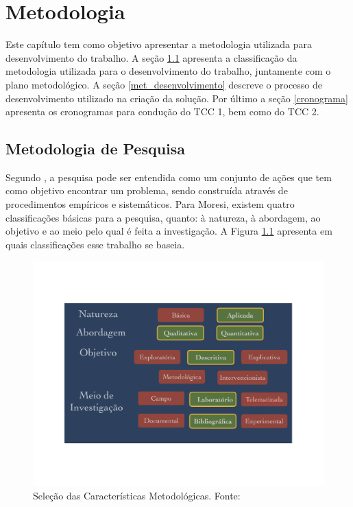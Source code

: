 \chapter[Metodologia]{Metodologia}

Este capítulo tem como objetivo apresentar a metodologia utilizada para desenvolvimento do trabalho. A seção \ref{met_pesquisa} apresenta a classificação da metodologia utilizada para o desenvolvimento do trabalho, juntamente com o plano metodológico. A seção \ref{met_desenvolvimento} descreve o processo de desenvolvimento utilizado na criação da solução. Por último a seção  \ref{cronograma} apresenta os cronogramas para condução do TCC 1, bem como do TCC 2.
\section{Metodologia de Pesquisa}
\label{met_pesquisa}
Segundo \cite{moresi_metodologia_2003}, a pesquisa pode ser entendida como um conjunto de ações que tem como objetivo encontrar um problema, sendo construída através de procedimentos empíricos e sistemáticos. Para Moresi, existem quatro classificações básicas para a pesquisa, quanto: à natureza, à abordagem, ao objetivo e ao meio pelo qual é feita a investigação. A Figura \ref{img:met_pesquisa} apresenta em quais classificações esse trabalho se baseia.
\graphicspath{{figuras/}}
\begin{figure}[h!]
\centering
\includegraphics[scale=0.50]{metodologia_pesquisa}
\caption{Seleção das Características Metodológicas. Fonte: \cite{moresi_metodologia_2003}}
\label{img:met_pesquisa}
\end{figure}

